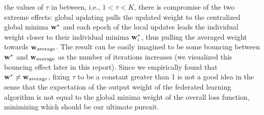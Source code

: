 \documentclass[11pt, fullpage,letterpaper]{article}
\newcommand{\bw}{{\bf w}}
\begin{document}
\begin{enumerate}
\begin{enumerate}
the values of $\tau$ in between, i.e., $1<\tau <K$, there is compromise of the two extreme effects: global updating pulls the updated weight to the centralized global minima $\bw^*$ and each epoch of the local updates leads the individual weight closer to their individual minima $\bw_i^*$, thus pulling the averaged weight towards $\bw_{\rm average}$. The result can be easily imagined to be some bouncing between $\bw^*$ and $\bw_{\rm average}$ as the number of iterations increases (we visualized this bouncing effect later in this report). Since we empirically found that $\bw^*\neq \bw_{\rm average}$, fixing $\tau$ to be a constant greater than 1 is not a good idea in the sense that the expectation of the output weight of the federated learning algorithm is not equal to the global minima weight of the overall loss function, minimizing which should be our ultimate pursuit.


\end{enumerate}
\end{enumerate}
\end{document}
